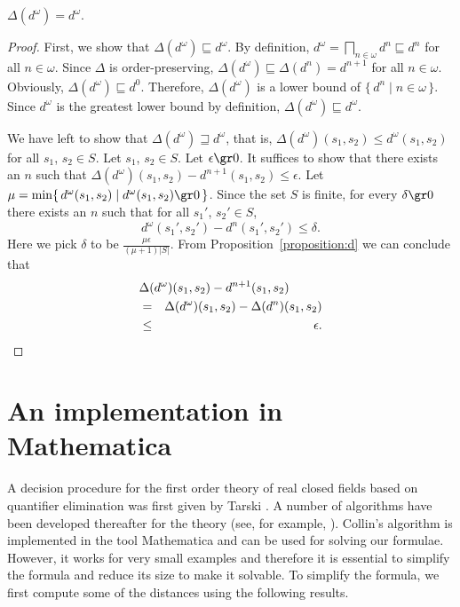\documentclass{LMCS}
\begin{document}
\begin{prop}
\label{proposition:6a}
$\Delta(d^{\omega}) = d^{\omega}$.
\end{prop}
\begin{proof}
First, we show that $\Delta(d^{\omega}) \sqsubseteq d^{\omega}$.
By definition, $d^{\omega} = \bigsqcap_{n \in \omega} d^n \sqsubseteq d^n$ for
all $n \in \omega$.  Since $\Delta$ is order-preserving,
$\Delta(d^{\omega}) \sqsubseteq \Delta(d^n) = d^{n+1}$ for all $n \in \omega$.
Obviously, $\Delta(d^{\omega}) \sqsubseteq d^0$.  Therefore,
$\Delta(d^{\omega})$ is a lower bound of $\{\, d^n \mid n \in \omega \,\}$.
Since $d^{\omega}$ is the greatest lower bound by definition,
$\Delta(d^{\omega}) \sqsubseteq d^{\omega}$.

We have left to show that $\Delta(d^{\omega}) \sqsupseteq d^{\omega}$, that is,
$\Delta(d^{\omega})(s_1, s_2) \leq d^{\omega}(s_1, s_2)$
for all $s_1$, $s_2 \in S$.  Let $s_1$, $s_2 \in S$.  Let $\epsilon \gr 0$.  It 
suffices to show that there exists an $n$ such that
$\Delta(d^{\omega})(s_1, s_2) - d^{n+1}(s_1, s_2) \leq \epsilon$. 
Let $\mu = \min \{\, d^{\omega}(s_1, s_2) \mid d^{\omega}(s_1, s_2) \gr 0 \,\}$.
Since the set $S$ is finite, for every $\delta \gr 0$ there exists an $n$
such that for all $s_1'$, $s_2' \in S$,
\begin{displaymath}
d^{\omega}(s_1', s_2') - d^n(s_1', s_2') \leq \delta.
\end{displaymath}
Here we pick $\delta$ to be $\frac{\mu \epsilon}{(\mu + 1) |S|}$.
From Proposition~\ref{proposition:d} we can conclude that
\begin{eqnarray*}
\lefteqn{\Delta(d^{\omega})(s_1, s_2) - d^{n+1}(s_1, s_2)}\\
& = & \Delta(d^{\omega})(s_1, s_2) - \Delta(d^n)(s_1, s_2)\\
& \leq & \epsilon.
\end{eqnarray*}
\end{proof}

\section{An implementation in Mathematica}
\label{section:8}

A decision procedure for the first order theory of real closed fields based 
on quantifier elimination was first given by Tarski \cite{T51}.  A number of 
algorithms have been developed thereafter for the theory (see, for example,
\cite{SPR96:jacm,C75:atfl,H05}).  Collin's algorithm is implemented in 
the tool Mathematica and can be used for solving our formulae.  However, it 
works for very small examples and therefore it is essential to simplify the 
formula and reduce its size to make it solvable.  To simplify the formula,
we first compute some of the distances using the following results.
\end{document}
